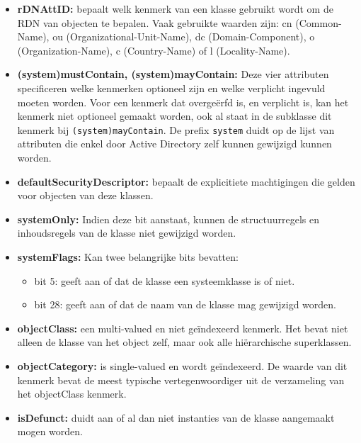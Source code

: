 \begin{enumerate}
		 { 
			\begin{itemize}
				\item \textbf{rDNAttID:} bepaalt welk kenmerk van een klasse gebruikt wordt om de RDN van objecten te bepalen. Vaak gebruikte waarden zijn: cn (Common-Name), ou (Organizational-Unit-Name), dc (Domain-Component), o (Organization-Name), c (Country-Name) of l (Locality-Name).
				\item \textbf{(system)mustContain, (system)mayContain:} Deze vier attributen specificeren welke kenmerken optioneel zijn en welke verplicht ingevuld moeten worden. Voor een kenmerk dat overgeërfd is, en verplicht is, kan het kenmerk niet optioneel gemaakt worden, ook al staat in de subklasse dit kenmerk bij \texttt{(system)mayContain}. De prefix \texttt{system} duidt op de lijst van attributen die enkel door Active Directory zelf kunnen gewijzigd kunnen worden. 
				\item \textbf{defaultSecurityDescriptor:} bepaalt de explicitiete machtigingen die gelden voor objecten van deze klassen.
				\item \textbf{systemOnly:} Indien deze bit aanstaat, kunnen de structuurregels en inhoudsregels van de klasse niet gewijzigd worden.
				\item \textbf{systemFlags:} Kan twee belangrijke bits bevatten:
					\begin{itemize}
						\item bit 5: geeft aan of dat de klasse een systeemklasse is of niet.
						\item bit 28: geeft aan of dat de naam van de klasse mag gewijzigd worden.
					\end{itemize}
				\item \textbf{objectClass:} een multi-valued en niet geïndexeerd kenmerk. Het bevat niet alleen de klasse van het object zelf, maar ook alle hiërarchische superklassen.
				\item \textbf{objectCategory:} is single-valued en wordt geïndexeerd. De waarde van dit kenmerk bevat de meest typische vertegenwoordiger uit de verzameling van het objectClass kenmerk.
				\item \textbf{isDefunct:} duidt aan of al dan niet instanties van de klasse aangemaakt mogen worden.
			\end{itemize}	
		}
		

\end{enumerate}
